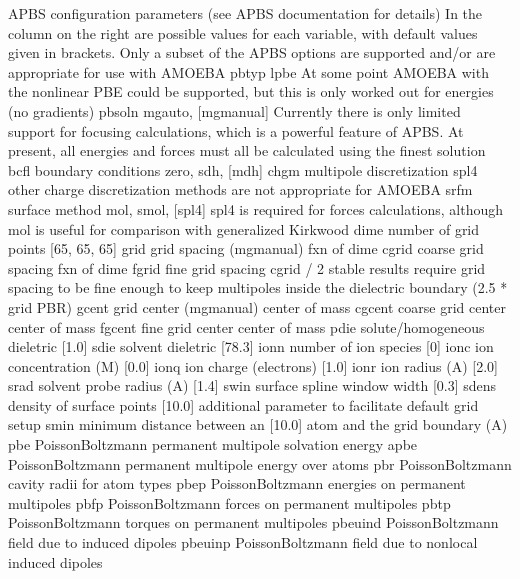 \documentclass[letterpaper,11pt,english]{sphinxmanual}
\begin{document}
\begin{sphinxVerbatim}[commandchars=\\\{\}]
APBS            configuration parameters (see APBS documentation for details)
In              the column on the right are possible values for each variable,
with            default values given in brackets. Only a subset of the APBS
options         are supported and/or are appropriate for use with AMOEBA
pbtyp           lpbe
At              some point AMOEBA with the non\PYGZhy{}linear PBE could be supported,
but             this is only worked out for energies (no gradients)
pbsoln          mg\PYGZhy{}auto, [mg\PYGZhy{}manual]
Currently       there is only limited support for focusing calculations,
which           is a powerful feature of APBS. At present, all energies and
forces          must all be calculated using the finest solution
bcfl            boundary conditions              zero, sdh, [mdh]
chgm            multipole discretization         spl4
other           charge discretization methods are not appropriate for AMOEBA
srfm            surface method                   mol, smol, [spl4]
spl4            is required for forces calculations, although mol is useful
for             comparison with generalized Kirkwood
dime            number of grid points            [65, 65, 65]
grid            grid spacing (mg\PYGZhy{}manual)         fxn of \PYGZdq{}dime\PYGZdq{}
cgrid           coarse grid spacing              fxn of \PYGZdq{}dime\PYGZdq{}
fgrid           fine grid spacing                cgrid / 2
stable          results require grid spacing to be fine enough to keep
multipoles      inside the dielectric boundary (2.5 * grid \PYGZlt{} PBR)
gcent           grid center (mg\PYGZhy{}manual)          center of mass
cgcent          coarse grid center               center of mass
fgcent          fine grid center                 center of mass
pdie            solute/homogeneous dieletric     [1.0]
sdie            solvent dieletric                [78.3]
ionn            number of ion species            [0]
ionc            ion concentration (M)            [0.0]
ionq            ion charge (electrons)           [1.0]
ionr            ion radius (A)                   [2.0]
srad            solvent probe radius (A)         [1.4]
swin            surface spline window width      [0.3]
sdens           density of surface points        [10.0]
additional      parameter to facilitate default grid setup
smin            minimum distance between an      [10.0]
atom            and the grid boundary (A)
pbe             Poisson\PYGZhy{}Boltzmann permanent multipole solvation energy
apbe            Poisson\PYGZhy{}Boltzmann permanent multipole energy over atoms
pbr             Poisson\PYGZhy{}Boltzmann cavity radii for atom types
pbep            Poisson\PYGZhy{}Boltzmann energies on permanent multipoles
pbfp            Poisson\PYGZhy{}Boltzmann forces on permanent multipoles
pbtp            Poisson\PYGZhy{}Boltzmann torques on permanent multipoles
pbeuind         Poisson\PYGZhy{}Boltzmann field due to induced dipoles
pbeuinp         Poisson\PYGZhy{}Boltzmann field due to non\PYGZhy{}local induced dipoles
\end{sphinxVerbatim}
\end{document}
